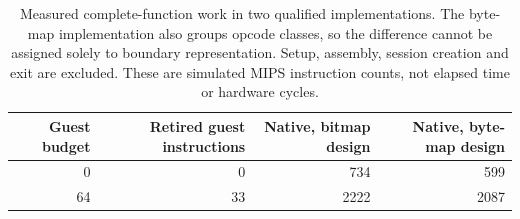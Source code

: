\begin{table}[!ht]
  \centering
  \begin{tabular}{r r r r}
    \toprule
    Guest budget & Retired guest instructions & Native, bitmap design & Native, byte-map design \\
    \midrule
    0            & 0                          & 734                   & 599                     \\
    64           & 33                         & 2222                  & 2087                    \\
    \bottomrule
  \end{tabular}
  \caption{Measured complete-function work in two qualified implementations. The byte-map implementation also groups opcode classes, so the difference cannot be assigned solely to boundary representation. Setup, assembly, session creation and exit are excluded. These are simulated MIPS instruction counts, not elapsed time or hardware cycles.}
  \label{tab:revision-bytecode-work}
\end{table}
